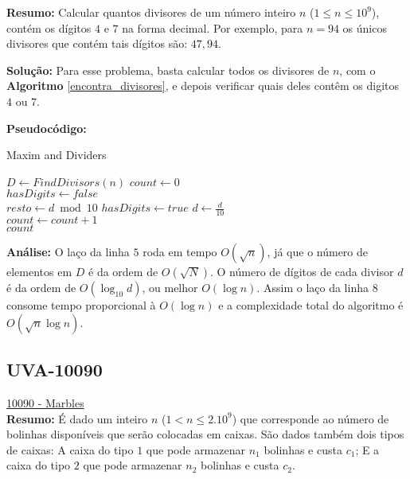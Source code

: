 \textbf{Resumo:}
Calcular quantos divisores de um número inteiro $n$ ($1\leq n \leq 10^9$), contém os dígitos $4$ e $7$ na forma decimal.
Por exemplo, para $n=94$ os únicos divisores que contém tais dígitos são: $47, 94$.
\newline

\textbf{Solução:}
Para esse problema, basta calcular todos os divisores de $n$, com o \textbf{Algoritmo} \autoref{encontra_divisores}, e depois verificar quais deles contêm os digitos $4$ ou $7$.
\clearpage

\textbf{Pseudocódigo:}
\begin{algorithm}
\caption{Maxim and Dividers}
\begin{algorithmic}[1]
\State $D \gets FindDivisors(n)$ 
\State $count \gets 0$
\\
\State $hasDigits \gets false$
\\
\State $resto \gets d \bmod 10$
\State $hasDigits \gets true$
\EndIf
\State $d \gets \frac{d}{10}$
\EndWhile
\\
\State $count \gets count + 1$
\EndIf
\EndFor
\\
\State \Return $count$

\EndProcedure
\end{algorithmic}
\end{algorithm}


\textbf{Análise:}
O laço da linha $5$ roda em tempo $O(\sqrt{n})$, já que o número de elementos em $D$ é da ordem de $O(\sqrt{N})$. O número de dígitos de cada divisor $d$ é da ordem de 
$O(\log_{10}d)$, ou melhor $O(\log n)$. Assim o laço da linha $8$ consome tempo proporcional à $O(\log n)$ e a complexidade total do algoritmo é $O(\sqrt n\log n)$. 



\subsection{UVA-10090}
\href{https://uva.onlinejudge.org/index.php?option=onlinejudge&page=show_problem&problem=1031}{10090 - Marbles}\\


\textbf{Resumo:}
É dado um inteiro $n$ ($1 < n \leq 2.10^9$) que corresponde ao número de bolinhas disponíveis que serão colocadas em caixas. São dados também dois tipos de caixas:
A caixa do tipo $1$ que pode armazenar $n_1$ bolinhas e custa $c_1$; E a caixa do tipo $2$ que pode armazenar $n_2$ bolinhas e custa $c_2$.

